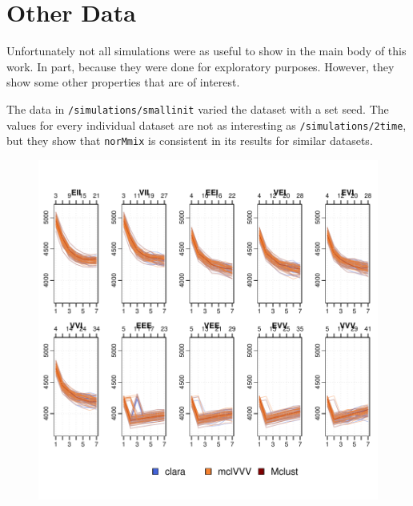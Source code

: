 \clearpage

\section{Other Data}

Unfortunately not all simulations were as useful to show in the main body of 
this work. In part, because they were done for exploratory purposes. However,
they show some other properties that are of interest.

The data in {\tt /simulations/smallinit} varied the dataset with a set seed.
The values for every individual dataset are not as interesting as 
{\tt /simulations/2time}, but they show that {\tt norMmix} is consistent in its
results for similar datasets.


\begin{figure}
    \centering
\includegraphics{App_plots-009}
\end{figure}

